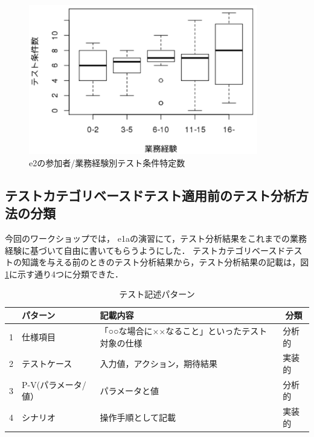 \begin{figure}[htbp]
  \begin{center}
  \includegraphics[width=10cm]{./image/D-3-Fig16.png}
  \caption{e2の参加者/業務経験別テスト条件特定数}
  \label{fig:D-3-Fig16}
  \end{center}
   \end{figure}


\subsection{テストカテゴリベースドテスト適用前のテスト分析方法の分類}
今回のワークショップでは， e1aの演習にて，テスト分析結果をこれまでの業務経験に基づいて自由に書いてもらうようにした．
テストカテゴリベースドテストの知識を与える前のときのテスト分析結果から，テスト分析結果の記載は，図\ref{tbl:D-3-tbl11}に示す通り4つに分類できた．
\begin{table}[htbp]

  \centering
  \caption{テスト記述パターン}
    \begin{tabular}{|c|p{9em}|p{14em}|p{3em}|}
    \hline
          & パターン & 記載内容 & \multicolumn{1}{c|}{分類} \bigstrut\\
    \hline
    \hline
    1     & 仕様項目  & 「○○な場合に××なること」といったテスト対象の仕様 & 分析的 \bigstrut\\
    \hline
    2     & テストケース & 入力値，アクション，期待結果 & 実装的 \bigstrut\\
    \hline
    3     & P-V(パラメータ/値） & パラメータと値 & 分析的 \bigstrut[t]\\
    \hline
    4     & シナリオ  & 操作手順として記載 & 実装的 \bigstrut[b]\\
    \hline
    \end{tabular}%
  \label{tbl:D-3-tbl11}%
\end{table}%

